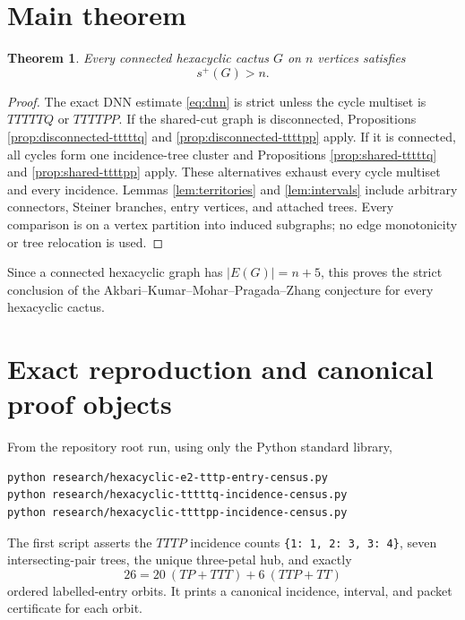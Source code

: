 \documentclass[11pt]{article}
\newtheorem{theorem}{Theorem}[section]
\newcommand{\spE}{s^+}
\begin{document}
\section{Main theorem}

\begin{theorem}\label{thm:main}
Every connected hexacyclic cactus $G$ on $n$ vertices satisfies
\[
 \boxed{\spE(G)>n}.
\]
\end{theorem}

\begin{proof}
The exact DNN estimate \eqref{eq:dnn} is strict unless the cycle multiset is
$TTTTTQ$ or $TTTTPP$.  If the shared-cut graph is disconnected, Propositions
\ref{prop:disconnected-tttttq} and \ref{prop:disconnected-ttttpp} apply.  If it
is connected, all cycles form one incidence-tree cluster and Propositions
\ref{prop:shared-tttttq} and \ref{prop:shared-ttttpp} apply.  These alternatives
exhaust every cycle multiset and every incidence.  Lemmas
\ref{lem:territories} and \ref{lem:intervals} include arbitrary connectors,
Steiner branches, entry vertices, and attached trees.  Every comparison is on
a vertex partition into induced subgraphs; no edge monotonicity or tree
relocation is used.
\end{proof}

Since a connected hexacyclic graph has $|E(G)|=n+5$, this proves the strict
conclusion of the Akbari--Kumar--Mohar--Pragada--Zhang conjecture
\cite[Conjecture~1.2]{AKMPZ} for every hexacyclic cactus.

\appendix
\section{Exact reproduction and canonical proof objects}\label{app:reproduction}

From the repository root run, using only the Python standard library,
\begin{verbatim}
python research/hexacyclic-e2-tttp-entry-census.py
python research/hexacyclic-tttttq-incidence-census.py
python research/hexacyclic-ttttpp-incidence-census.py
\end{verbatim}
The first script asserts the $TTTP$ incidence counts
\verb|{1: 1, 2: 3, 3: 4}|, seven intersecting-pair trees, the unique
three-petal hub, and exactly
\[
 26=20\ (TP+TTT)+6\ (TTP+TT)
\]
ordered labelled-entry orbits.  It prints a canonical incidence, interval, and
packet certificate for each orbit.
\end{document}
